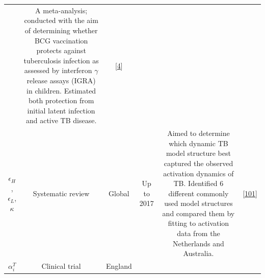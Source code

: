 \documentclass[11pt,twoside]{bristolthesis}
\begin{document}
\begin{longtable}[]{@{}cccccc@{}}
\begin{minipage}[t]{0.07\columnwidth}
  \end{minipage} & \begin{minipage}[t]{0.31\columnwidth}\centering
  A meta-analysis; conducted with the aim of
  determining whether BCG vaccination protects
  against tuberculosis infection as assessed by
  interferon \(\gamma\) release assays (IGRA) in
  children. Estimated both protection from initial
  latent infection and active TB disease.\strut
  \end{minipage} & \begin{minipage}[t]{0.10\columnwidth}\centering
  {[}\protect\hyperlink{ref-Roy2014}{4}{]}\strut
  \end{minipage}\tabularnewline
  \begin{minipage}[t]{0.19\columnwidth}\centering
  \(\epsilon_H\),
  \(\epsilon_L\),
  \(\kappa\)\strut
  \end{minipage} & \begin{minipage}[t]{0.09\columnwidth}\centering
  Systematic
  review\strut
  \end{minipage} & \begin{minipage}[t]{0.07\columnwidth}\centering
  Global\strut
  \end{minipage} & \begin{minipage}[t]{0.07\columnwidth}\centering
  Up to
  2017\strut
  \end{minipage} & \begin{minipage}[t]{0.31\columnwidth}\centering
  Aimed to determine which dynamic TB model
  structure best captured the observed activation
  dynamics of TB. Identified 6 different commonly
  used model structures and compared them by fitting
  to activation data from the Netherlands and
  Australia.\strut
  \end{minipage} & \begin{minipage}[t]{0.10\columnwidth}\centering
  {[}\protect\hyperlink{ref-Ragonnet2017}{101}{]}\strut
  \end{minipage}\tabularnewline
  \begin{minipage}[t]{0.19\columnwidth}\centering
  \(\alpha_i^T\)\strut
  \end{minipage} & \begin{minipage}[t]{0.09\columnwidth}\centering
  Clinical
  trial\strut
  \end{minipage} & \begin{minipage}[t]{0.07\columnwidth}\centering
  England\strut
  \end{minipage} & \begin{minipage}[t]{0.07\columnwidth}\centering

\end{minipage}
\end{longtable}
\end{document}
